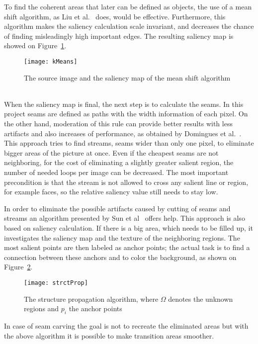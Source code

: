 \documentclass[draft,final]{vutinfth} %
\begin{document}
	To find the coherent areas that later can be defined as objects, the use of a mean shift algorithm, as Liu et al.~\cite{liu2006region} does, would be effective. 
	Furthermore, this algorithm makes the saliency calculation scale invariant, and decreases the chance of finding misleadingly high important edges.
	The resulting saliency map is showed on Figure~\ref{fig:kmean}.\par
	\begin{figure}[H]
		\centering		
		\texttt{[image: kMeans]}
		\caption{The source image and the saliency map of the mean shift algorithm ~\cite{liu2006region} }
		\label{fig:kmean}
	\end{figure} 
	When the saliency map is final, the next step is to calculate the seams.
	In this project seams are defined as paths with the width information of each pixel.
	On the other hand, moderation of this rule can provide better results with less artifacts and also increases of performance, as obtained by Domingues et al.~\cite{domingues2010stream}.
	This approach tries to find streams, seams wider than only one pixel, to eliminate bigger areas of the picture at once.
	Even if the cheapest seams are not neighboring, for the cost of eliminating a slightly greater salient region, the number of needed loops per image can be decreased.
	The most important precondition is that the stream is not allowed to cross any salient line or region, for example faces, so the relative saliency value still needs to stay low. \par
	In order to eliminate the possible artifacts caused by cutting of seams and streams an algorithm presented by  Sun et al~\cite{sun2005image} offers help.
	This approach is also based on saliency calculation.
	If there is a big area, which needs to be filled up, it investigates the saliency map and the texture of the neighboring regions.
	The most salient points are then labeled as anchor points; the actual task is to find a connection between these anchors and to color the background, as shown on Figure~\ref{fig:structProp}.
	\begin{figure}[H]
		\centering		
		\texttt{[image: strctProp]}
		\caption{The structure propagation algorithm, where $\Omega$ denotes the unknown regions and $p_{i}$ the anchor points ~\cite{sun2005image}} 
		\label{fig:structProp}
	\end{figure}
	In case of seam carving the goal is not to recreate the eliminated areas but with the above algorithm it is possible to make transition areas smoother.
\end{document}
